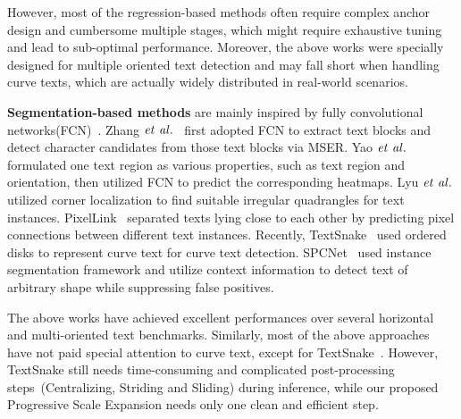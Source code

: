 \documentclass[10pt,twocolumn,letterpaper]{article}
\begin{document}
	However, most of the regression-based methods often require complex anchor design and cumbersome multiple stages, which might require exhaustive tuning and lead to sub-optimal performance. Moreover, the above works were specially designed for multiple oriented text detection and may fall short when handling curve texts, which are actually widely distributed in
	real-world scenarios.
	
	\textbf{Segmentation-based methods} are mainly inspired by fully convolutional networks(FCN)~\cite{FCN}. 
	Zhang $\it{et~al.}$~\cite{zhang2016multi} first adopted FCN to extract text blocks and detect character candidates from those text blocks via MSER.
	Yao $\it{et~al.}$~\cite{yao2016scene} formulated one text region as various
	properties, such as text region and orientation, then utilized FCN to predict the corresponding heatmaps.
	Lyu $\it{et~al.}$\cite{lyu2018multi} utilized corner localization to find suitable irregular quadrangles for text instances. 
	PixelLink~\cite{PixelLink} separated texts lying close to each other by predicting pixel connections between different text instances.
	Recently, TextSnake~\cite{textsnake} used ordered disks to represent curve text for curve text detection.
	SPCNet~\cite{xie2018scene} used instance segmentation framework and utilize context information to detect text of arbitrary shape while suppressing false positives.
	
	The above works have achieved excellent performances over several horizontal and multi-oriented text benchmarks.
	Similarly, most of the above approaches have not paid special attention to curve text, except for TextSnake~\cite{textsnake}. 
	However, TextSnake still needs time-consuming and complicated
	post-processing steps~(Centralizing, Striding and Sliding) during inference, while our proposed Progressive Scale Expansion needs only one clean and efficient step.
	
\end{document}
